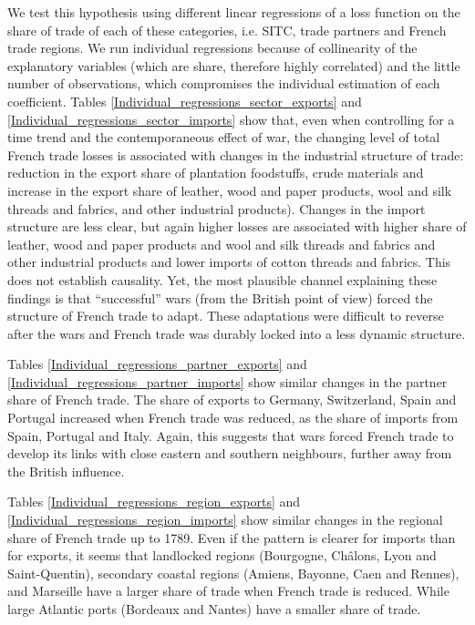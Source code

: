 \documentclass[12pt,a4paper,notitlepage,english]{article}
\begin{document}
We test this hypothesis using different linear regressions of a loss function on the share of trade of each of these categories, i.e. SITC, trade partners and French trade regions.
We run individual regressions because of collinearity of the explanatory variables (which are share, therefore highly correlated) and the little number of observations, which compromises the individual estimation of each coefficient.
Tables \ref{Individual_regressions_sector_exports} and \ref{Individual_regressions_sector_imports} show that, even when controlling for a time trend and the contemporaneous effect of war, the changing level of total French trade losses is associated with changes in the industrial structure of trade: reduction in the export share of plantation foodstuffs, crude materials and increase in the export share of leather, wood and paper products, wool and silk threads and fabrics, and other industrial products).
Changes in the import structure are less clear, but again higher losses are associated with higher share of leather, wood and paper products and wool and silk threads and fabrics and other industrial products and lower imports of cotton threads and fabrics.
This does not establish causality. Yet, the most plausible channel explaining these findings is that ``successful'' wars (from the British point of view) forced the structure of French trade to adapt.
These adaptations were difficult to reverse after the wars and French trade was durably locked into a less dynamic structure.

Tables \ref{Individual_regressions_partner_exports} and \ref{Individual_regressions_partner_imports} show similar changes in the partner share of French trade.
The share of exports to Germany, Switzerland, Spain and Portugal increased when French trade was reduced, as the share of imports from Spain, Portugal and Italy. 
Again, this suggests that wars forced French trade to develop its links with close eastern and southern neighbours, further away from the British influence.

Tables \ref{Individual_regressions_region_exports} and \ref{Individual_regressions_region_imports} show similar changes in the regional share of French trade up to 1789.
Even if the pattern is clearer for imports than for exports, it seems that landlocked regions (Bourgogne, Châlons, Lyon and Saint-Quentin), secondary coastal regions (Amiens, Bayonne, Caen and Rennes), and Marseille have a larger share of trade when French trade is reduced.
While large Atlantic ports (Bordeaux and Nantes) have a smaller share of trade.
\end{document}

